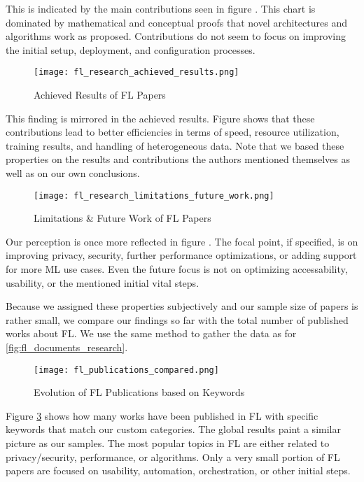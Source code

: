 This is indicated by the main contributions seen in figure \cite{fig:fl_research_contributions}.
This chart is dominated by mathematical and conceptual proofs that novel
architectures and algorithms work as proposed.
Contributions do not seem to focus on improving the initial setup, deployment, and configuration processes.

\begin{figure}[h]
    \centering
    \texttt{[image: fl\_research\_achieved\_results.png]}
    \caption{Achieved Results of FL Papers}
    \label{fig:fl_research_achieved_results}
\end{figure}

This finding is mirrored in the achieved results.
Figure \cite{fig:fl_research_achieved_results} shows that these contributions
lead to better efficiencies in terms of speed, resource utilization, training results,
and handling of heterogeneous data.
Note that we based these properties on the results and contributions the authors mentioned themselves
as well as on our own conclusions.

\begin{figure}[h]
    \centering
    \texttt{[image: fl\_research\_limitations\_future\_work.png]}
    \caption{Limitations \& Future Work of FL Papers}
    \label{fig:fl_research_limitations_future_work}
\end{figure}

Our perception is once more reflected in figure \cite{fig:fl_research_limitations_future_work}.
The focal point, if specified, is on improving privacy, security, further performance optimizations, or adding support for more ML use cases.
Even the future focus is not on optimizing accessability, usability, or the mentioned initial vital steps.

Because we assigned these properties subjectively and our sample size of papers is rather small,
we compare our findings so far with the total number of published works about FL.
We use the same method to gather the data as for \ref{fig:fl_documents_research}.

\begin{figure}[h]
    \centering
    \texttt{[image: fl\_publications\_compared.png]}
    \caption{Evolution of FL Publications based on Keywords}
    \label{fig:fl_publications_compared}
\end{figure}


Figure \ref{fig:fl_publications_compared} shows how many works have been published in FL with
specific keywords that match our custom categories.
The global results paint a similar picture as our samples.
The most popular topics in FL are either related to privacy/security, performance,
or algorithms.
Only a very small portion of FL papers are focused on usability, automation, orchestration,
or other initial steps.

